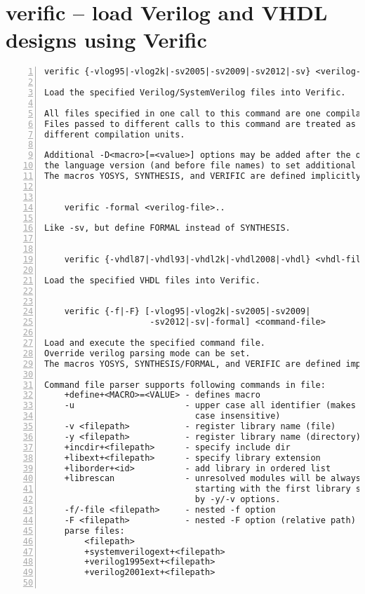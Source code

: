 \section{verific -- load Verilog and VHDL designs using Verific}
\label{cmd:verific}
\begin{lstlisting}[numbers=left,frame=single]
    verific {-vlog95|-vlog2k|-sv2005|-sv2009|-sv2012|-sv} <verilog-file>..

Load the specified Verilog/SystemVerilog files into Verific.

All files specified in one call to this command are one compilation unit.
Files passed to different calls to this command are treated as belonging to
different compilation units.

Additional -D<macro>[=<value>] options may be added after the option indicating
the language version (and before file names) to set additional verilog defines.
The macros YOSYS, SYNTHESIS, and VERIFIC are defined implicitly.


    verific -formal <verilog-file>..

Like -sv, but define FORMAL instead of SYNTHESIS.


    verific {-vhdl87|-vhdl93|-vhdl2k|-vhdl2008|-vhdl} <vhdl-file>..

Load the specified VHDL files into Verific.


    verific {-f|-F} [-vlog95|-vlog2k|-sv2005|-sv2009|
                     -sv2012|-sv|-formal] <command-file>

Load and execute the specified command file.
Override verilog parsing mode can be set.
The macros YOSYS, SYNTHESIS/FORMAL, and VERIFIC are defined implicitly.

Command file parser supports following commands in file:
    +define+<MACRO>=<VALUE> - defines macro
    -u                      - upper case all identifier (makes Verilog parser
                              case insensitive)
    -v <filepath>           - register library name (file)
    -y <filepath>           - register library name (directory)
    +incdir+<filepath>      - specify include dir
    +libext+<filepath>      - specify library extension
    +liborder+<id>          - add library in ordered list
    +librescan              - unresolved modules will be always searched
                              starting with the first library specified
                              by -y/-v options.
    -f/-file <filepath>     - nested -f option
    -F <filepath>           - nested -F option (relative path)
    parse files:
        <filepath>
        +systemverilogext+<filepath>
        +verilog1995ext+<filepath>
        +verilog2001ext+<filepath>


\end{lstlisting}

